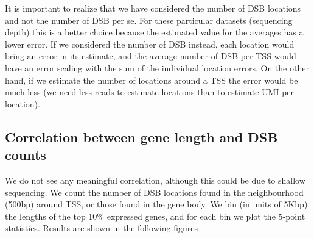 \documentclass[11pt,a4paper]{article}
\begin{document}
It is important to realize that we have considered the number of DSB locations and not the number of DSB per se. For these particular datasets (sequencing depth) this is a better choice because the estimated value for the averages has a lower error. If we considered the number of DSB instead, each location would bring an error in its estimate, and the average number of DSB per TSS would have an error scaling with the sum of the individual location errors. On the other hand, if we estimate the number of locations around a TSS the error would be much less (we need less reads to estimate locations than to estimate UMI per location). 

\subsection{Correlation between gene length and DSB counts}
We do not see any meaningful correlation, although this could be due to shallow sequencing. We count the number of DSB locations found in the neighbourhood (500bp) around TSS, or those found in the gene body. We bin (in units of 5Kbp) the lengths of the top 10\% expressed genes, and for each bin we plot the 5-point statistics. Results are shown in the following figures
\end{document}
